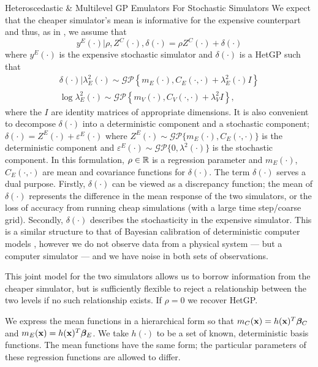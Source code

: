 \begin{chapter}{Heteroscedastic \& Multilevel GP Emulators For Stochastic Simulators\label{Ch:Hetsml}}
We expect that the cheaper simulator's mean is informative for the expensive counterpart and thus, as in \cite{Kennedy2000}, we assume that
\begin{equation}
	y^E(\cdot)|\rho, Z^C(\cdot), \delta(\cdot) = \rho Z^C(\cdot) + \delta(\cdot)
\end{equation}
where $y^E (\cdot)$ is the expensive stochastic simulator and $\delta(\cdot)$ is a HetGP such that
\begin{align}
	\delta(\cdot)|\lambda_E^2 (\cdot) \sim \mathcal{GP}\left\{ m_E(\cdot), C_E(\cdot, \cdot) + \lambda^2_E(\cdot)I \right\} \\
\log \lambda^2_E(\cdot) \sim \mathcal{GP} \left\{ m_V(\cdot), C_V (\cdot, \cdot) + \lambda_{V}^2 I \right\},
\end{align}
where the $I$ are identity matrices of appropriate dimensions. It is also convenient to decompose $\delta(\cdot)$ into a deterministic component and a stochastic component; $\delta(\cdot) = Z^E(\cdot) + \varepsilon^E(\cdot)$ where $Z^E(\cdot) \sim \mathcal{GP}\{m_E(\cdot), C_E(\cdot, \cdot)\}$ is the deterministic component and $\varepsilon^E(\cdot) \sim \mathcal{GP}\{0, \lambda^2(\cdot)\}$ is the stochastic component.
In this formulation, $\rho \in \mathbb{R}$ is a regression parameter and $m_E(\cdot)$, $C_E(\cdot, \cdot)$ are mean and covariance functions for $\delta(\cdot)$. The term $\delta(\cdot)$ serves a dual purpose. Firstly, $\delta(\cdot)$ can be viewed as a discrepancy function; the mean of $\delta(\cdot)$ represents the difference in the mean response of the two simulators, or the loss of accuracy from running cheap simulations (with a large time step/coarse grid). Secondly, $\delta(\cdot)$ describes the stochasticity in the expensive simulator. This is a similar structure to that of Bayesian calibration of deterministic computer models \citep{Ohagan01}, however we do not observe data from a physical system --- but a computer simulator --- and we have noise in both sets of observations.

This joint model for the two simulators allows us to borrow information from the cheaper simulator, but is sufficiently flexible to reject a relationship between the two levels if no such relationship exists. If $\rho = 0$ we recover HetGP.

We express the mean functions in a hierarchical form so that	$m_C(\mathbf{x}) = h(\mathbf{x})^T \bm{\bm{\beta}}_C$ and $m_E(\mathbf{x}) = h(\mathbf{x})^T \bm{\bm{\beta}}_E$. We take $h(\cdot)$ to be a set of known, deterministic basis functions. The mean functions have the same form; the particular parameters of these regression functions are allowed to differ.


\end{chapter}
